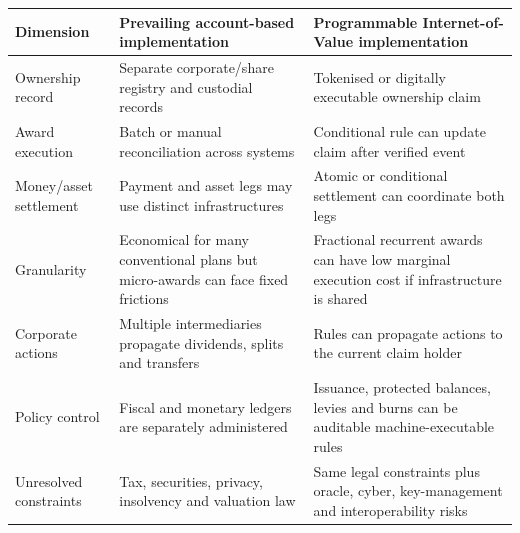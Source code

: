 \begin{tabularx}{\linewidth}{@{}p{.22\linewidth}p{.34\linewidth}X@{}}
\toprule
Dimension & Prevailing account-based implementation & Programmable Internet-of-Value implementation \\
\midrule
Ownership record & Separate corporate/share registry and custodial records & Tokenised or digitally executable ownership claim \\
Award execution & Batch or manual reconciliation across systems & Conditional rule can update claim after verified event \\
Money/asset settlement & Payment and asset legs may use distinct infrastructures & Atomic or conditional settlement can coordinate both legs \\
Granularity & Economical for many conventional plans but micro-awards can face fixed frictions & Fractional recurrent awards can have low marginal execution cost if infrastructure is shared \\
Corporate actions & Multiple intermediaries propagate dividends, splits and transfers & Rules can propagate actions to the current claim holder \\
Policy control & Fiscal and monetary ledgers are separately administered & Issuance, protected balances, levies and burns can be auditable machine-executable rules \\
Unresolved constraints & Tax, securities, privacy, insolvency and valuation law & Same legal constraints plus oracle, cyber, key-management and interoperability risks \\
\bottomrule
\end{tabularx}
